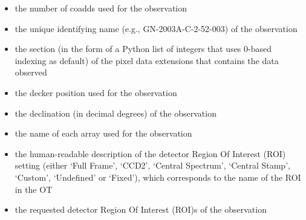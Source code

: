 \documentclass[letterpaper,10pt,english]{sphinxmanual}
\begin{document}
\begin{itemize}
\item {} 
the number of coadds used for the observation

\end{itemize}

\begin{itemize}
\item {} 
the unique identifying name (e.g., GN-2003A-C-2-52-003) of the observation

\end{itemize}

\begin{itemize}
\item {} 
the section (in the form of a Python list of integers that uses 0-based
indexing as default) of the pixel data extensions that contains the data
observed

\end{itemize}

\begin{itemize}
\item {} 
the decker position used for the observation

\end{itemize}

\begin{itemize}
\item {} 
the declination (in decimal degrees) of the observation

\end{itemize}

\begin{itemize}
\item {} 
the name of each array used for the observation

\end{itemize}

\begin{itemize}
\item {} 
the human-readable description of the detector Region Of Interest (ROI)
setting (either `Full Frame', `CCD2', `Central Spectrum', `Central Stamp',
`Custom', `Undefined' or `Fixed'), which corresponds to the name of the ROI
in the OT

\end{itemize}

\begin{itemize}
\item {} 
the requested detector Region Of Interest (ROI)s of the observation

\end{itemize}
\end{document}
